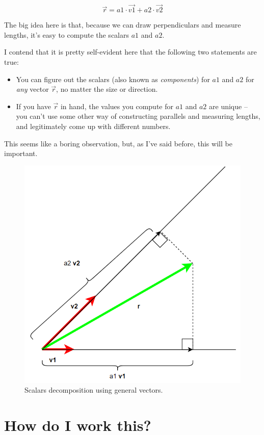 \documentclass[
]{book}
\providecommand{\tightlist}{%
  \setlength{\itemsep}{0pt}\setlength{\parskip}{0pt}}
\begin{document}
\[\vec{r} = a1 \cdot \vec{v1} + a2 \cdot \vec{v2}\]

The big idea here is that, because we can draw perpendiculars and measure lengths, it's easy to compute the scalars \(a1\) and \(a2\).

I contend that it is pretty self-evident here that the following two statements are true:

\begin{itemize}
\tightlist
\item
  You can figure out the scalars (also known as \emph{components}) for \(a1\) and \(a2\) for \emph{any} vector \(\vec{r}\), no matter the size or direction.
\item
  If you have \(\vec{r}\) in hand, the values you compute for \(a1\) and \(a2\) are unique -- you can't use some other way of constructing parallels and measuring lengths, and legitimately come up with different numbers.
\end{itemize}

This seems like a boring observation, but, as I've said before, this will be important.

\begin{figure}

{\centering \includegraphics[width=0.75\linewidth,height=0.75\textheight]{images/parallelogram-decomposition} 

}

\caption{Scalars decomposition using general vectors.}\label{fig:unnamed-chunk-5}
\end{figure}

\hypertarget{how-do-i-work-this}{%
\chapter{How do I work this?}\label{how-do-i-work-this}}
\end{document}
